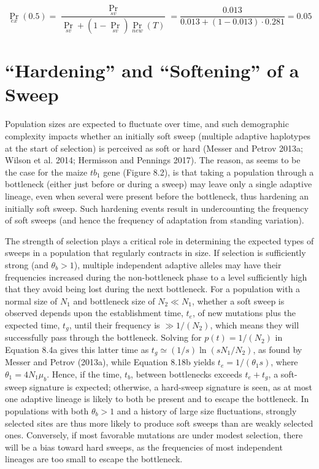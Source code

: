 \documentclass{article}
\begin{document}
\begin{equation}
\Pr_{ex}(0.5)=\frac{\Pr_{sv}}{\Pr_{sv}+(1-\Pr_{sv})\Pr_{new}(T)}=\frac{0.013}{0.013+(1-0.013)\cdot0.281}=0.05
\end{equation}

\section{“Hardening” and “Softening” of a Sweep}
Population sizes are expected to fluctuate over time, and such demographic complexity impacts whether an initially soft sweep (multiple adaptive haplotypes at the start of selection) is perceived as soft or hard (Messer and Petrov 2013a; Wilson et al. 2014; Hermisson and Pennings 2017). The reason, as seems to be the case for the maize  $ tb_{1} $ gene (Figure 8.2), is that taking a population through a bottleneck (either just before or during a sweep) may leave only a single adaptive lineage, even when several were present before the bottleneck, thus hardening an initially soft sweep. Such hardening events result in undercounting the frequency of soft sweeps (and hence the frequency of adaptation from standing variation).

The strength of selection plays a critical role in determining the expected types of sweeps in a population that regularly contracts in size. If selection is sufficiently strong (and  $ \theta_b > 1 $), multiple independent adaptive alleles may have their frequencies increased during the non-bottleneck phase to a level sufficiently high that they avoid being lost during the next bottleneck. For a population with a normal size of  $ N_1 $ and bottleneck size of  $ N_2 \ll N_1 $, whether a soft sweep is observed depends upon the establishment time,  $ t_e $, of new mutations plus the expected time,  $ t_g $, until their frequency is  $ \gg 1/(N_2) $, which means they will successfully pass through the bottleneck. Solving for  $ p(t) = 1/(N_2) $ in Equation 8.4a gives this latter time as  $ t_g \simeq (1/s) \ln(s N_1/N_2) $, as found by Messer and Petrov (2013a), while Equation 8.18b yields  $ t_e = 1/(\theta_1 s) $, where  $ \theta_1 = 4 N_1 \mu_b $. Hence, if the time,  $ t_b $, between bottlenecks exceeds  $ t_e + t_g $, a soft-sweep signature is expected; otherwise, a hard-sweep signature is seen, as at most one adaptive lineage is likely to both be present and to escape the bottleneck. In populations with both  $ \theta_b > 1 $ and a history of large size fluctuations, strongly selected sites are thus more likely to produce soft sweeps than are weakly selected ones. Conversely, if most favorable mutations are under modest selection, there will be a bias toward hard sweeps, as the frequencies of most independent lineages are too small to escape the bottleneck.
\end{document}

